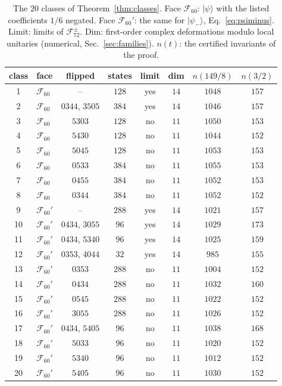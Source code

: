 \documentclass[aps,pra,reprint,superscriptaddress,amsmath,amssymb,longbibliography]{revtex4-2}
\newcommand{\ket}[1]{\lvert #1\rangle}
\theoremstyle{plain}
\begin{document}
\begin{table}[t]
\caption{The $20$ classes of Theorem~\ref{thm:classes}.  Face $\mathcal F_{60}$: $\ket\psi$ with the listed coefficients $1/6$
negated.  Face $\mathcal F_{60}'$: the same for $\ket{\psi_-}$, Eq.~\eqref{eq:psiminus}.  Limit: limits of $\mathcal F_{72}^\pm$.
Dim: first-order complex deformations modulo local unitaries (numerical, Sec.~\ref{sec:families}).
$n(t)$: the certified invariants of the proof.}
\label{tab:classes}
\begin{ruledtabular}
\begin{tabular}{clcccccc}
class & face & flipped & states & limit & dim & $n(149/8)$ & $n(3/2)$\\
\hline
1 & $\mathcal F_{60}$ & -- & $128$ & yes & $14$ & $1048$ & $157$\\
2 & $\mathcal F_{60}$ & $0344$, $3505$ & $384$ & yes & $14$ & $1046$ & $157$\\
3 & $\mathcal F_{60}$ & $5303$ & $128$ & no & $11$ & $1050$ & $153$\\
4 & $\mathcal F_{60}$ & $5430$ & $128$ & no & $11$ & $1044$ & $152$\\
5 & $\mathcal F_{60}$ & $5045$ & $128$ & no & $11$ & $1053$ & $153$\\
6 & $\mathcal F_{60}$ & $0533$ & $384$ & no & $11$ & $1055$ & $153$\\
7 & $\mathcal F_{60}$ & $0455$ & $384$ & no & $11$ & $1052$ & $153$\\
8 & $\mathcal F_{60}$ & $0344$ & $384$ & no & $11$ & $1052$ & $152$\\
9 & $\mathcal F_{60}'$ & -- & $288$ & yes & $14$ & $1021$ & $157$\\
10 & $\mathcal F_{60}'$ & $0434$, $3055$ & $96$ & yes & $14$ & $1029$ & $173$\\
11 & $\mathcal F_{60}'$ & $0434$, $5340$ & $96$ & yes & $14$ & $1025$ & $159$\\
12 & $\mathcal F_{60}'$ & $0353$, $4044$ & $32$ & yes & $14$ & $985$ & $155$\\
13 & $\mathcal F_{60}'$ & $0353$ & $288$ & no & $11$ & $1004$ & $152$\\
14 & $\mathcal F_{60}'$ & $0434$ & $288$ & no & $11$ & $1032$ & $160$\\
15 & $\mathcal F_{60}'$ & $0545$ & $288$ & no & $11$ & $1022$ & $152$\\
16 & $\mathcal F_{60}'$ & $3055$ & $288$ & no & $11$ & $1026$ & $152$\\
17 & $\mathcal F_{60}'$ & $0434$, $5405$ & $96$ & no & $11$ & $1038$ & $168$\\
18 & $\mathcal F_{60}'$ & $5033$ & $96$ & no & $11$ & $1020$ & $152$\\
19 & $\mathcal F_{60}'$ & $5340$ & $96$ & no & $11$ & $1012$ & $152$\\
20 & $\mathcal F_{60}'$ & $5405$ & $96$ & no & $11$ & $1030$ & $152$\\
\end{tabular}
\end{ruledtabular}
\end{table}
\end{document}
